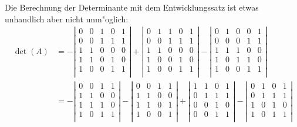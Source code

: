\begin{loesung}
Die Berechnung der Determinante mit dem Entwicklungssatz ist etwas unhandlich
aber nicht unm"oglich:
\begin{align*}
\det(A)&=
-\left|\begin{matrix}
0&0&1&0&1\\
0&0&1&1&1\\
1&1&0&0&0\\
1&1&0&1&0\\
1&0&0&1&1\\
\end{matrix}\right|
+\left|\begin{matrix}
0&1&1&0&1\\
0&0&1&1&1\\
1&1&0&0&0\\
1&0&0&1&0\\
1&0&0&1&1\\
\end{matrix}\right|
-\left|\begin{matrix}
0&1&0&0&1\\
0&0&0&1&1\\
1&1&1&0&0\\
1&0&1&1&0\\
1&0&0&1&1\\
\end{matrix}\right|
\\
&=
-\left|\begin{matrix}
0&0&1&1\\
1&1&0&0\\
1&1&1&0\\
1&0&1&1\\
\end{matrix}\right|
-\left|\begin{matrix}
0&0&1&1\\
1&1&0&0\\
1&1&0&1\\
1&0&0&1\\
\end{matrix}\right|
%
+\left|\begin{matrix}
1&1&0&1\\
0&1&1&1\\
0&0&1&0\\
0&0&1&1\\
\end{matrix}\right|
-\left|\begin{matrix}
0&1&0&1\\
0&1&1&1\\
1&0&1&0\\
1&0&1&1\\
\end{matrix}\right|

\end{align*}
\end{loesung}

